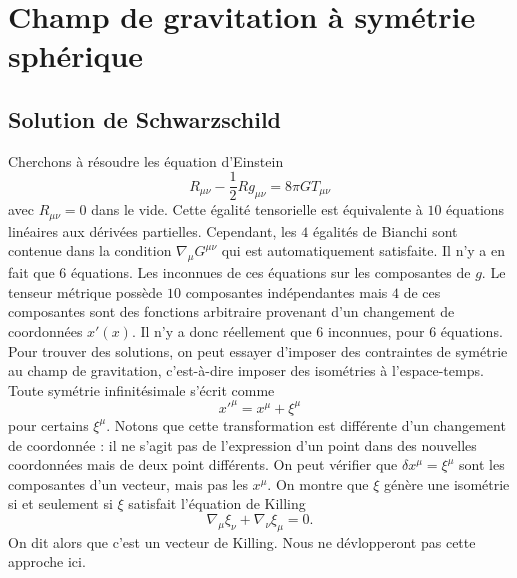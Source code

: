 \documentclass[a4paper,11pt]{report}
\theoremstyle{definition}
\theoremstyle{plain}
\theoremstyle{definition}
\theoremstyle{remark}
\begin{document}
\chapter{Champ de gravitation à symétrie sphérique}

    \section{Solution de Schwarzschild}
    
        Cherchons à résoudre les équation d'Einstein
        \begin{equation}
            R_{\mu\nu}-\frac{1}{2}Rg_{\mu\nu} = 8\pi G T_{\mu\nu}
        \end{equation}
        avec $R_{\mu\nu} = 0$ dans le vide. Cette égalité tensorielle est équivalente à $10$ équations linéaires aux dérivées partielles. Cependant, les $4$ égalités de Bianchi sont contenue dans la condition $\nabla_\mu G^{\mu\nu}$ qui est automatiquement satisfaite. Il n'y a en fait que $6$ équations. Les inconnues de ces équations sur les composantes de $g$. Le tenseur métrique possède $10$ composantes indépendantes mais $4$ de ces composantes sont des fonctions arbitraire provenant d'un changement de coordonnées $x'(x)$. Il n'y a donc réellement que $6$ inconnues, pour $6$ équations.\\
        
        Pour trouver des solutions, on peut essayer d'imposer des contraintes de symétrie au champ de gravitation, c'est-à-dire imposer des isométries à l'espace-temps. Toute symétrie infinitésimale s'écrit comme
        \begin{equation}
            x'^\mu = x^\mu +  \xi^\mu
        \end{equation}
        pour certains $ \xi^\mu$. Notons que cette transformation est différente d'un changement de coordonnée : il ne s'agit pas de l'expression d'un point dans des nouvelles coordonnées mais de deux point différents. On peut vérifier que $\delta x^\mu = \xi^\mu$ sont les composantes d'un vecteur, mais pas les $x^\mu$. On montre que $\xi$ génère une isométrie si et seulement si $\xi$ satisfait l'équation de Killing
        \begin{equation}
            \nabla_\mu\xi_\nu+\nabla_\nu\xi_\mu = 0.
        \end{equation}
        On dit alors que c'est un vecteur de Killing. Nous ne dévlopperont pas cette approche ici.\\
        
\end{document}
